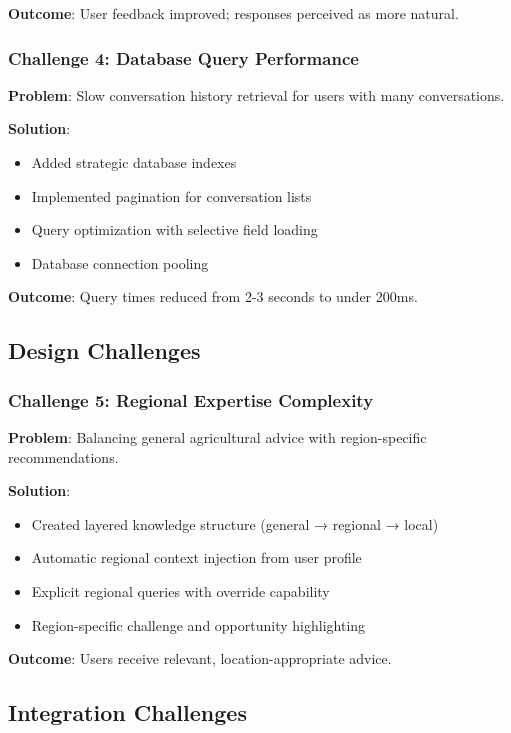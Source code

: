 \documentclass[12pt,a4paper]{article}
\begin{document}
\textbf{Outcome}: User feedback improved; responses perceived as more natural.

\subsubsection{Challenge 4: Database Query Performance}

\textbf{Problem}: Slow conversation history retrieval for users with many conversations.

\textbf{Solution}:
\begin{itemize}[leftmargin=*]
    \item Added strategic database indexes
    \item Implemented pagination for conversation lists
    \item Query optimization with selective field loading
    \item Database connection pooling
\end{itemize}

\textbf{Outcome}: Query times reduced from 2-3 seconds to under 200ms.

\subsection{Design Challenges}

\subsubsection{Challenge 5: Regional Expertise Complexity}

\textbf{Problem}: Balancing general agricultural advice with region-specific recommendations.

\textbf{Solution}:
\begin{itemize}[leftmargin=*]
    \item Created layered knowledge structure (general → regional → local)
    \item Automatic regional context injection from user profile
    \item Explicit regional queries with override capability
    \item Region-specific challenge and opportunity highlighting
\end{itemize}

\textbf{Outcome}: Users receive relevant, location-appropriate advice.

\subsection{Integration Challenges}
\end{document}
